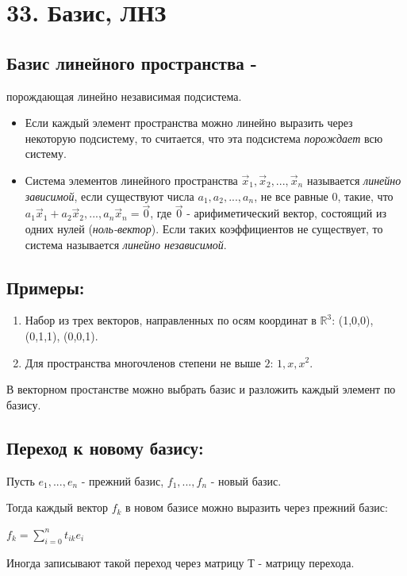 \documentclass[12pt]{article}
\begin{document}
    \section{33. Базис, ЛНЗ}
    \subsection{Базис линейного пространства -} порождающая линейно независимая подсистема.

    \begin{itemize}
        \item Если каждый элемент пространства можно линейно выразить через некоторую подсистему, то считается, что эта подсистема \textit{порождает} всю систему.

        \item Система элементов линейного пространства $\vec x_{1}, \vec x_{2}, ..., \vec x_{n}$ называется \textit{линейно зависимой}, если существуют числа $a_{1}, a_{2},..., a_{n}$, не все равные 0, такие, что $a_{1}\vec x_{1} + a_{2}\vec x_{2},..., a_{n}\vec x_{n} = \vec 0$, где $\vec 0$ - арифиметический вектор, состоящий из одних нулей (\textit{ноль-вектор}). Если таких коэффициентов не существует, то система называется \textit{линейно независимой}.

    \end{itemize}
    \subsection{Примеры:}

    \begin{enumerate}
        \item Набор из трех векторов, направленных по осям координат в $\mathbb{R}^{3}$:
              (1,0,0), (0,1,1), (0,0,1).

        \item Для пространства многочленов степени не выше $2$: $1, x, x^{2}$.
    \end{enumerate}


    В векторном простанстве можно выбрать базис и разложить каждый элемент по базису.

    \subsection{Переход к новому базису:}

    Пусть $e_{1},...,e_{n}$ - прежний базис, $f_{1},...,f_{n}$ - новый базис.

    Тогда каждый вектор $f_{k}$ в новом базисе можно выразить через прежний базис:

$f_{k} = \sum\limits_{i=0}^n t_{ik}e_{i}$

Иногда записывают такой переход через матрицу Т - матрицу перехода.
\end{document}
